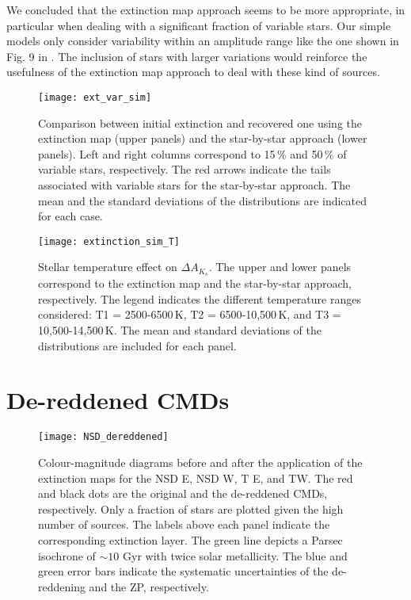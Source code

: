\documentclass{aa}
\begin{document}
We concluded that the extinction map approach seems to be more appropriate, in particular when dealing with a significant fraction of variable stars. Our simple models only consider variability within an amplitude range like the one shown in Fig. 9 in \citet{2017MNRAS.470.3427D}. The inclusion of stars with larger variations would reinforce the usefulness of the extinction map approach to deal with these kind of sources.




   \begin{figure}
   \texttt{[image: ext\_var\_sim]}
   \caption{Comparison between initial extinction and recovered one using the extinction map (upper panels) and the star-by-star approach (lower panels). Left and right columns correspond to 15\,\% and 50\,\% of variable stars, respectively. The red arrows indicate the tails associated with variable stars for the star-by-star approach. The mean and the standard deviations of the distributions are indicated for each case.}

   \label{ext_sim_var}
    \end{figure}




   \begin{figure}
   \texttt{[image: extinction\_sim\_T]}
   \caption{Stellar temperature effect on $\Delta A_{K_s}$. The upper and lower panels correspond to the extinction map and the star-by-star approach, respectively. The legend indicates the different temperature ranges considered: T1 = 2500-6500\,K, T2 = 6500-10,500\,K, and T3 = 10,500-14,500\,K. The mean and standard deviations of the distributions are included for each panel.}

   \label{ext_sim_var_T}
    \end{figure}







\section{De-reddened CMDs}
\label{dereddenedCMDs}


       \begin{figure*}[h!]
   \texttt{[image: NSD\_dereddened]}
   \caption{Colour-magnitude diagrams before and after the application of the extinction maps for the NSD E, NSD W, T E, and TW. The red and black dots are the original and the de-reddened CMDs, respectively. Only a fraction of stars are plotted given the high number of sources. The labels above each panel indicate the corresponding extinction layer. The green line depicts a Parsec isochrone of $\sim 10$ Gyr with twice solar metallicity. The blue and green error bars indicate the systematic uncertainties of the de-reddening and the ZP, respectively.}

   \label{dereddened1}
    \end{figure*}
    
\end{document}

